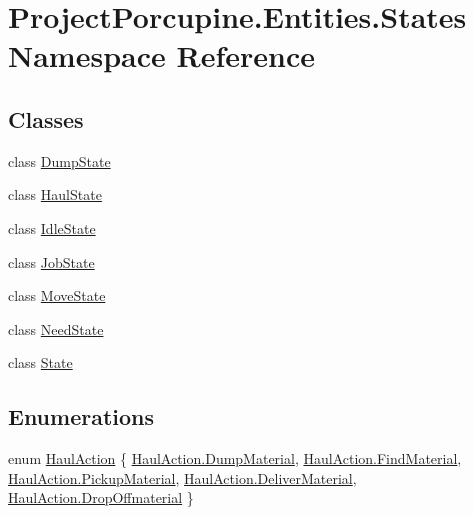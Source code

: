 \hypertarget{namespace_project_porcupine_1_1_entities_1_1_states}{}\section{Project\+Porcupine.\+Entities.\+States Namespace Reference}
\label{namespace_project_porcupine_1_1_entities_1_1_states}
\subsection*{Classes}
\begin{DoxyCompactItemize}
\item 
class \hyperlink{class_project_porcupine_1_1_entities_1_1_states_1_1_dump_state}{Dump\+State}
\item 
class \hyperlink{class_project_porcupine_1_1_entities_1_1_states_1_1_haul_state}{Haul\+State}
\item 
class \hyperlink{class_project_porcupine_1_1_entities_1_1_states_1_1_idle_state}{Idle\+State}
\item 
class \hyperlink{class_project_porcupine_1_1_entities_1_1_states_1_1_job_state}{Job\+State}
\item 
class \hyperlink{class_project_porcupine_1_1_entities_1_1_states_1_1_move_state}{Move\+State}
\item 
class \hyperlink{class_project_porcupine_1_1_entities_1_1_states_1_1_need_state}{Need\+State}
\item 
class \hyperlink{class_project_porcupine_1_1_entities_1_1_states_1_1_state}{State}
\end{DoxyCompactItemize}
\subsection*{Enumerations}
\begin{DoxyCompactItemize}
\item 
enum \hyperlink{namespace_project_porcupine_1_1_entities_1_1_states_a4a6529ce49c0b5b689910c62dddb456e}{Haul\+Action} \{ \newline
\hyperlink{namespace_project_porcupine_1_1_entities_1_1_states_a4a6529ce49c0b5b689910c62dddb456ea16d94e2c73cf336114133f3d0119fe3f}{Haul\+Action.\+Dump\+Material}, 
\hyperlink{namespace_project_porcupine_1_1_entities_1_1_states_a4a6529ce49c0b5b689910c62dddb456ea8eed6cdc172ce8cd80f54307f721a23b}{Haul\+Action.\+Find\+Material}, 
\hyperlink{namespace_project_porcupine_1_1_entities_1_1_states_a4a6529ce49c0b5b689910c62dddb456ea863b99a00a4e37586964d89abdd24804}{Haul\+Action.\+Pickup\+Material}, 
\hyperlink{namespace_project_porcupine_1_1_entities_1_1_states_a4a6529ce49c0b5b689910c62dddb456eab954fa1f38dc8936aa6993f2eec5c2b0}{Haul\+Action.\+Deliver\+Material}, 
\newline
\hyperlink{namespace_project_porcupine_1_1_entities_1_1_states_a4a6529ce49c0b5b689910c62dddb456ea2f3d49e958565150de184118fe43dd2d}{Haul\+Action.\+Drop\+Offmaterial}
 \}
\end{DoxyCompactItemize}


